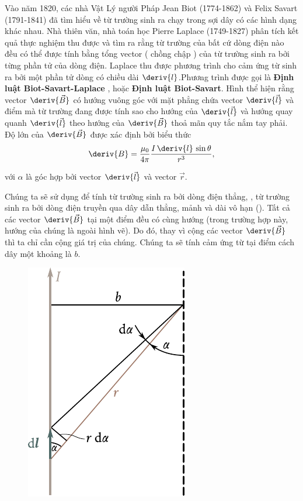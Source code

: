 Vào năm 1820, các nhà Vật Lý người Pháp Jean Biot (1774-1862) và Felix Savart (1791-1841) đã tìm hiểu về từ trường sinh ra chạy trong sợi dây có các hình dạng khác nhau. Nhà thiên văn, nhà toán học Pierre Laplace (1749-1827) phân tích kết quả thực nghiệm thu được và tìm ra rằng từ trường của bất cứ dòng điện nào đều có thể được tính bằng tổng vector ( chồng chập ) của từ trường sinh ra bởi từng phần tử của dòng điện. Laplace thu được phương trình  cho cảm ứng từ sinh ra bởi một phần tử dòng có chiều dài $\deriv{l}$.Phương trình   được gọi là   \textbf{ Định luật Biot-Savart-Laplace }, hoặc  \textbf{ Định luật  Biot-Savart}. Hình  thể hiện rằng vector $\deriv{\vec{B}}$ có hướng vuông góc với mặt phẳng chứa vector $\deriv{\vec{l}}$ và điểm mà từ trường đang được tính sao cho hướng của $\deriv{\vec{l}}$ và hướng quay quanh $\deriv{\vec{l}}$ theo hướng của $\deriv{\vec{B}}$ thoả mãn quy tắc nắm tay phải.
Độ lớn của $\deriv{\vec{B}}$ được xác định bởi biểu thức 
\begin{equation}\label{eq:6_29}
    \deriv{B} = \frac{\mu_0}{4\pi} \frac{I\, \deriv{l}\, \sin\theta}{r^3},
\end{equation}

\noindent
với $\alpha$ là góc hợp bởi vector $\deriv{\vec{l}}$ và vector $\vec{r}$.

Chúng ta sẽ sử dụng  để tính từ trường sinh ra bởi dòng điện thẳng, \ie, từ trường sinh ra bởi dòng điện truyền qua dây dẫn thẳng, mảnh và dài vô hạn (). Tất cả các vector $\deriv{\vec{B}}$ tại một điểm đều có cùng hướng (trong trường hợp này, hướng của chúng là ngoài hình vẽ). Do đó, thay vì cộng các vector $\deriv{\vec{B}}$ thì ta chỉ cần cộng giá trị của chúng. Chúng ta sẽ tính cảm ứng từ tại điểm cách dây một khoảng là $b$.

\begin{figure}[t]
	\begin{center}
		\includegraphics[scale=1]{figures/ch_06/fig_6_4.pdf}
		\caption[]{}
		\label{fig:6_4}
	\end{center}
	\vspace{-0.8cm}
\end{figure}

